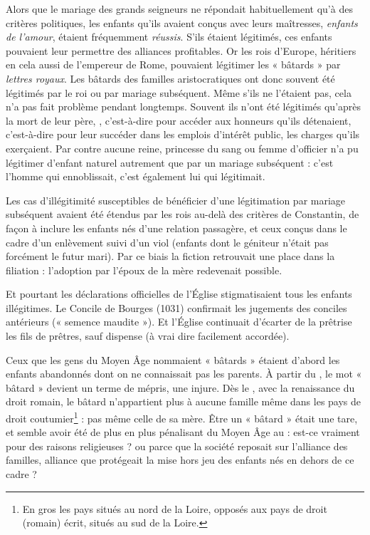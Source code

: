  Alors que le mariage des grands seigneurs ne répondait habituellement qu'à des critères politiques, les enfants qu'ils avaient conçus avec leurs maîtresses, \emph{enfants de l'amour}, étaient fréquemment \emph{réussis}. S'ils étaient légitimés, ces enfants pouvaient leur permettre des alliances profitables. Or les rois d'Europe, héritiers en cela aussi de l'empereur de Rome, pouvaient légitimer les « bâtards » par \emph{lettres royaux}. Les bâtards des familles aristocratiques ont donc souvent été légitimés par le roi ou par mariage subséquent. Même s'ils ne l'étaient pas, cela n'a pas fait problème pendant longtemps. Souvent ils n'ont été légitimés qu'après la mort de leur père, , c'est-à-dire pour accéder aux honneurs qu'ils détenaient, c'est-à-dire pour leur succéder dans les emplois d'intérêt public, les charges qu'ils exerçaient. Par contre aucune reine, princesse du sang ou femme d'officier n'a pu légitimer d'enfant naturel autrement que par un mariage subséquent : c'est l'homme qui ennoblissait, c'est également lui qui légitimait. 

 Les cas d'illégitimité susceptibles de bénéficier d'une légitimation par mariage subséquent avaient été étendus par les rois au-delà des critères de Constantin, de façon à inclure les enfants nés d'une relation passagère, et ceux conçus dans le cadre d'un enlèvement suivi d'un viol (enfants dont le géniteur n'était pas forcément le futur mari). Par ce biais la fiction retrouvait une place dans la filiation : l'adoption par l'époux de la mère redevenait possible. 

 Et pourtant les déclarations officielles de l'Église stigmatisaient tous les enfants illégitimes. Le Concile de Bourges (1031) confirmait les jugements des conciles antérieurs (« semence maudite »). Et l'Église continuait d'écarter de la prêtrise les fils de prêtres, sauf dispense (à vrai dire facilement accordée). 



 Ceux que les gens du Moyen Âge nommaient « bâtards » étaient d'abord les enfants abandonnés dont on ne connaissait pas les parents. À partir du , le mot « bâtard » devient un terme de mépris, une injure. Dès le , avec la renaissance du droit romain, le bâtard n'appartient plus à aucune famille même dans les pays de droit coutumier\footnote{En gros les pays situés au nord de la Loire, opposés aux pays de droit (romain) écrit, situés au sud de la Loire.} 
: pas même celle de sa mère. Être un « bâtard » était une tare, et semble avoir été de plus en plus pénalisant du Moyen Âge au  : est-ce vraiment pour des raisons religieuses ? ou parce que la société reposait sur l'alliance des familles, alliance que protégeait la mise hors jeu des enfants nés en dehors de ce cadre ?

